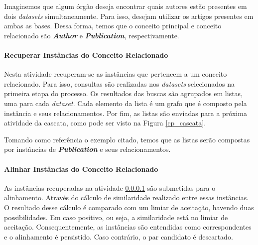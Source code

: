 Imaginemos que algum órgão deseja encontrar quais autores estão presentes em dois \textit{datasets} simultaneamente. Para isso, desejam utilizar os artigos presentes em ambas as bases. Dessa forma, temos que o conceito principal e conceito relacionado são \textbf{\textit{Author}} e \textbf{\textit{Publication}}, respectivamente.

\paragraph{Recuperar Instâncias do Conceito Relacionado}
\label{recuperao_relacionado}
Nesta atividade recuperam-se as instâncias que pertencem a um conceito relacionado. Para isso, consultas são realizadas nos \textit{datasets} selecionados na primeira etapa do processo.  Os resultados das buscas são agrupados em listas, uma para cada \textit{dataset}. Cada elemento da lista é um grafo que é composto pela instância e seus relacionamentos. Por fim, as listas são enviadas para a próxima atividade da cascata, como pode ser visto na Figura \ref{cp_cascata}.

Tomando como referência o exemplo citado, temos que as listas serão compostas por instâncias de \textbf{\textit{Publication}} e seus relacionamentos.

\paragraph{Alinhar Instâncias do Conceito Relacionado}
\label{lista_rel}

As instâncias recuperadas na atividade \ref{recuperao_relacionado} são submetidas para o alinhamento. Através do cálculo de similaridade realizado entre essas instâncias. O resultado desse cálculo é comparado com um limiar de aceitação, havendo duas possibilidades. Em caso positivo, ou seja, a similaridade está no limiar de aceitação. Consequentemente, as instâncias são entendidas como correspondentes e o alinhamento é persistido. Caso contrário, o par candidato é descartado.

